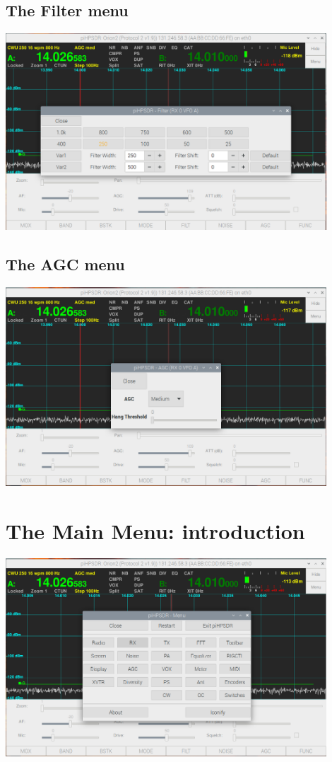\documentclass[12pt]{book}
\begin{document}
\section{The Filter menu}
\begin{center}
\includegraphics[width=12cm]{FilterMenu.png}
\end{center}

\section{The AGC menu}
\begin{center}
\includegraphics[width=12cm]{AGCmenu.png}
\end{center}

\chapter{The Main Menu: introduction}

\begin{center}
\includegraphics[width=12cm]{MainMenu.png}
\end{center}
\end{document}
